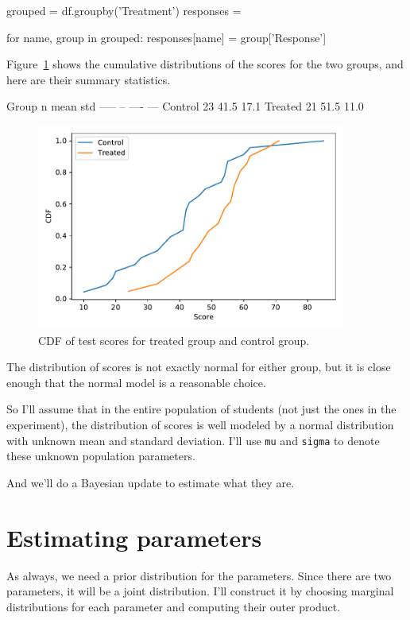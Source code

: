 \documentclass[12pt]{book}
\theoremstyle{exercise}
\newcommand{\py}[1]{{\tt #1}}%
\begin{document}
\begin{code}
grouped = df.groupby('Treatment')
responses = {}

for name, group in grouped:
    responses[name] = group['Response']
\end{code}

Figure~\ref{fig11-01} shows the cumulative distributions of the scores for the two groups, and here are their summary statistics.

\begin{stdout}
Group      n     mean    std
-----      --    ----    ---
Control    23    41.5    17.1
Treated    21    51.5    11.0
\end{stdout}

\begin{figure}
\centerline{\includegraphics[width=4in]{figs/fig11-01.pdf}}
\caption{CDF of test scores for treated group and control group.}
\label{fig11-01}
\end{figure}

The distribution of scores is not exactly normal for either group, but
it is close enough that the normal model is a reasonable choice.

So I'll assume that in the entire population of students (not just the
ones in the experiment), the distribution of scores is well modeled by a
normal distribution with unknown mean and standard deviation. I'll use
\py{mu} and \py{sigma} to
denote these unknown population parameters.

And we'll do a Bayesian update to estimate what they are.

\section{Estimating parameters}

As always, we need a prior distribution for the parameters.
Since there are two parameters, it will be a joint distribution.
I'll construct it by choosing marginal distributions for each parameter
and computing their outer product.
\end{document}
